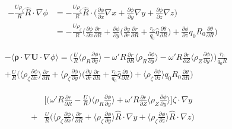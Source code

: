 \documentclass[12pt]{article}
\begin{document}
\begin{CJK*}{UTF8}{gbsn}
\begin{equation}
    \begin{split}
        -\frac{U\rho_\zeta}{R}\hat{R}\cdot\nabla\phi &= -\frac{U\rho_\zeta}{R}\hat{R}\cdot\bigg(\frac{\partial\phi}{\partial x}\nabla x
        + \frac{\partial\phi}{\partial y}\nabla y + \frac{\partial\phi}{\partial z}\nabla z\bigg)\\
        &=-\frac{U\rho_\zeta}{R}\bigg(\frac{\partial\phi}{\partial x}\frac{\partial r}{\partial R} 
        + \frac{\partial\phi}{\partial y}\bigg(\frac{\partial y}{\partial r}\frac{\partial r}{\partial R}
        + \frac{r_0}{q_0}\hat{q}\frac{\partial \theta}{\partial R}\bigg)
        + \frac{\partial \phi}{\partial z}q_0R_0\frac{\partial \theta}{\partial R}\bigg)
    \end{split}
\end{equation}

\begin{equation}
    \begin{split}
        &-\langle\boldsymbol{\rho}\cdot\nabla \mathbf{U}\cdot\nabla\phi\rangle=
        \bigg(\frac{U}{R}\bigg\langle\rho_R\frac{\partial\phi}{\partial y}\bigg\rangle -\omega'R\frac{\partial r}{\partial R}\bigg\langle\rho_R\frac{\partial\phi}{\partial y}\bigg\rangle -\omega'R\frac{\partial r}{\partial Z}\bigg\langle\rho_Z\frac{\partial\phi}{\partial y}\bigg\rangle\bigg)\frac{r_0}{q_0R}\\
        &+\frac{U}{R}\bigg(\bigg\langle\rho_\zeta\frac{\partial\phi}{\partial x}\bigg\rangle\frac{\partial r}{\partial R} 
        + \bigg\langle\rho_\zeta\frac{\partial\phi}{\partial y}\bigg\rangle\bigg(\frac{\partial y}{\partial r}\frac{\partial r}{\partial R}
        + \frac{r_0}{q_0}\hat{q}\frac{\partial \theta}{\partial R}\bigg)
        + \bigg\langle\rho_\zeta\frac{\partial \phi}{\partial z}\bigg\rangle q_0R_0\frac{\partial \theta}{\partial R}\bigg)
    \end{split}
\end{equation}

{\color{blue}
\begin{equation*}
    \begin{split}
        &\bigg[\bigg(\omega'R\frac{\partial r}{\partial R} - \frac{U}{R}\bigg)\bigg\langle\rho_R\frac{\partial\phi}{\partial y}\bigg\rangle + \omega'R\frac{\partial r}{\partial Z}\bigg\langle\rho_Z\frac{\partial\phi}{\partial y}\bigg\rangle\bigg]\hat{\zeta}\cdot\nabla y\\
        +&\frac{U}{R}\bigg(\bigg\langle\rho_\zeta\frac{\partial\phi}{\partial x}\bigg\rangle\frac{\partial r}{\partial R} 
        + \bigg\langle\rho_\zeta\frac{\partial\phi}{\partial y}\bigg\rangle\hat{R}\cdot\nabla y
        + \bigg\langle\rho_\zeta\frac{\partial \phi}{\partial z}\bigg\rangle \hat{R}\cdot\nabla z\bigg)
    \end{split}
\end{equation*}}


\end{CJK*}
\end{document}
